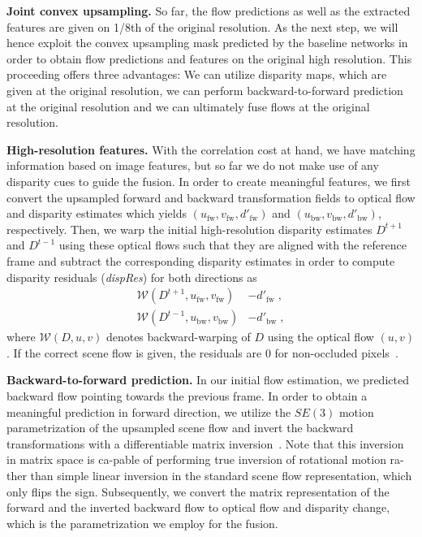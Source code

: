 \documentclass[10pt,twocolumn,letterpaper]{article}
\newcommand*\circled[1]{\tikz[baseline=(char.base)]{\node[shape=circle,draw,inner sep=0.5pt] (char) {#1};}}
\begin{document}
\medskip
\noindent
\circled{3} \textbf{Joint convex upsampling.}
So far, the flow predictions as well as the extracted features are given on 1/8th of the original resolution.
As the next step, we will hence exploit the convex upsampling mask predicted by the baseline networks in order to obtain flow predictions and features on the original high resolution.
This proceeding offers three advantages:
We can utilize disparity maps, which are given at the original resolution, we can perform backward-to-forward prediction at the original resolution and we can ultimately fuse flows at the original resolution.


\medskip
\noindent
\circled{4} \textbf{High-resolution features.}
With the correlation cost at hand, we have matching information based on image features, but so far we do not make use of any disparity cues to guide the fusion.
In order to create meaningful features, we first convert the upsampled forward and backward transformation fields to optical flow and disparity estimates which yields $(u_\text{fw},v_\text{fw}, d'_\text{fw})$ and $(u_\text{bw},v_\text{bw}, d'_\text{bw})$, respectively.
Then, we warp the initial high-resolution disparity estimates $D^{t+1}$ and $D^{t-1}$ using these optical flows such that they are aligned with the reference frame and subtract the corresponding disparity estimates in order to compute disparity residuals (\emph{dispRes}) for both directions as
\begin{align}
    \mathcal{W}(D^{t+1}, u_\text{fw},v_\text{fw}) &- d'_\text{fw} \;,
    \\
    \mathcal{W}(D^{t-1}, u_\text{bw},v_\text{bw}) &- d'_\text{bw} \;,
\end{align}
where $\mathcal{W}(D, u,v)$ denotes backward-warping of $D$ using the optical flow $(u,v)$.
If the correct scene flow is given, the residuals are 0 for non-occluded pixels~\cite{Teed2021_RAFT3D}.

\medskip
\noindent
\circled{5} \textbf{Backward-to-forward prediction.}
In our initial flow estimation, we predicted backward flow pointing towards the previous frame.
In order to obtain a meaningful prediction in forward direction, we utilize the $SE(3)$ motion parametrization of the upsampled scene flow and invert the backward transformations with a differentiable matrix inversion~\cite{Teed2021_Lie}.
Note that this inversion in matrix space is ca-\linebreak pable of performing true inversion of rotational motion ra- ther than simple linear inversion in the standard scene flow representation, which only flips the sign.
Subsequently, we convert the matrix representation of the forward and the inverted backward flow to optical flow and disparity change, which is the parametrization we employ for the fusion.
\end{document}
